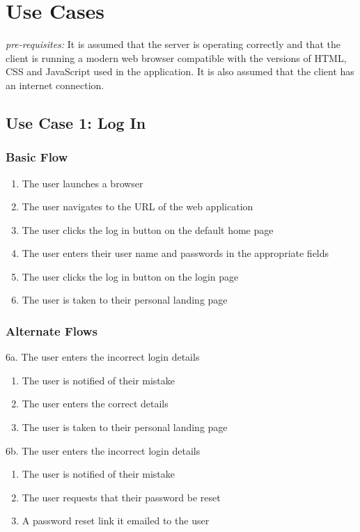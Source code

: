 \documentclass[12pt,onecolumn]{article}
\begin{document}
\newpage

\appendix

\section{Use Cases} \label{moreusecase}

\emph{pre-requisites:} It is assumed that the server is operating correctly and that the client is running a modern web browser compatible with the versions of HTML, CSS and JavaScript used in the application. It is also assumed that the client has an internet connection.

	\subsection{Use Case 1: Log In}

		\subsubsection{Basic Flow}

		\begin{enumerate}
			\item The user launches a browser

			\item The user navigates to the URL of the web application

			\item The user clicks the log in button on the default home page

			\item The user enters their user name and passwords in the appropriate fields

			\item The user clicks the log in button on the login page

			\item The user is taken to their personal landing page

		\end{enumerate}

		\subsubsection{Alternate Flows}

		6a. The user enters the incorrect login details

		\begin{enumerate}
			\item The user is notified of their mistake

			\item The user enters the correct details

			\item The user is taken to their personal landing page
		\end{enumerate}

		\hspace{-0.8cm} 6b. The user enters the incorrect login details

		\begin{enumerate}
			\item The user is notified of their mistake

			\item The user requests that their password be reset

			\item A password reset link it emailed to the user
		\end{enumerate}
\end{document}
